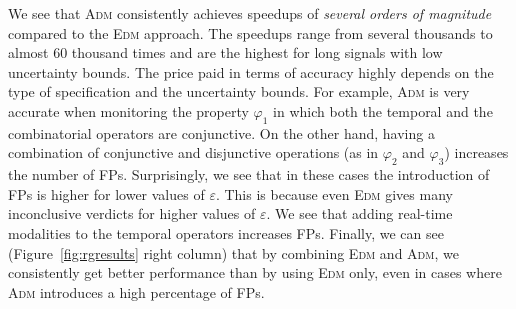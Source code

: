 We see that \textsc{Adm} consistently achieves speedups of \emph{several orders of magnitude} 
compared to the \textsc{Edm} approach.
The speedups range from several thousands to almost 60 thousand times
and are the highest for long signals with low uncertainty bounds.
The price paid in terms of accuracy highly depends on the type of specification and the uncertainty bounds.
For example, \textsc{Adm} is very accurate when monitoring the property $\varphi_1$ in which both the temporal and the combinatorial operators are conjunctive.
On the other hand, having a combination of conjunctive and disjunctive operations (as in $\varphi_{2}$ and $\varphi_{3}$) increases the number of FPs.
Surprisingly, we see that in these cases the introduction of FPs is higher for lower values of $\varepsilon$.
This is because even \textsc{Edm} gives many inconclusive verdicts for higher values of $\varepsilon$.
We see that adding real-time modalities to the temporal operators increases FPs.
Finally, we can see (Figure~\ref{fig:rgresults} right column) that by combining \textsc{Edm} and \textsc{Adm}, we consistently get better performance than by using \textsc{Edm} only, even in cases where \textsc{Adm} introduces a high percentage of FPs.



